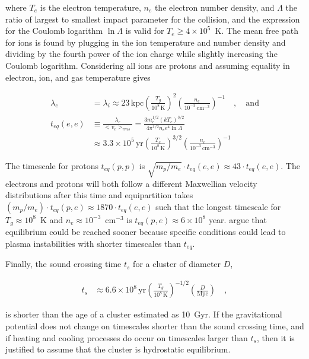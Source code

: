 \documentclass[MScProj_TLRH_ClusterEnergy.tex]{subfiles}
\begin{document}
\noindent where $T_e$ is the electron temperature, $n_e$ the electron number
density, and $\Lambda$ the ratio of largest to smallest impact parameter for
the collision, and the expression for the Coulomb logarithm $\ln \Lambda$ is 
valid for $T_e \geq 4 \times 10^5$~K. The mean free path for ions is found by 
plugging in the ion temperature and number density and dividing by the fourth 
power of the ion charge while slightly increasing the Coulomb logarithm. 
Considering all ions are protons and assuming equality in electron, ion, and gas
temperature gives

\begin{align}
    \lambda_e &= \lambda_i \approx 23 \, \text{kpc}
    \left( \frac{T_g}{10^8 \, \text{K}} \right)^2
    \left( \frac{n_e}{10^{-3} \, \text{cm}^{-3}} \right)^{-1}
    \quad , \quad \text{and}\label{eq:coulombmeanfreepathnumerical} \\
    t_{eq}(e,e) &\equiv \frac{\lambda_e}{<v_e>_{rms}} = 
    \frac{3 m_e^{1/2}(kT_e)^{3/2}}{4 \pi^{1/2} n_e e^4 \ln \Lambda} \\
    &\approx 3.3 \times 10^5 \, \text{yr} 
    \left( \frac{T_e}{10^8 \, \text{K}} \right)^{3/2}
    \left( \frac{n_e}{10^{-3} \, \text{cm}^{-3}} \right)^{-1} \label{eq:tcoulomb}
\end{align}

The timescale for protons $t_{eq}(p,p)$ is $\sqrt{m_p/m_e}\cdot t_{eq}(e,e) 
\approx 43 \cdot t_{eq}(e,e)$. The electrons and protons will both follow a
different Maxwellian velocity distributions after this time and equipartition
takes $(m_p/m_e) \cdot t_{eq}(p,e) \approx 1870 \cdot t_{eq}(e,e)$ such that
the longest timescale for $T_g\approx 10^8$~K and $n_e\approx10^{-3}$~cm$^{-3}$
is $t_{eq}(p,e)\approx6 \times 10^8$ year. \citet{1977ApJ...215..213M} argue
that equilibrium could be reached sooner because specific conditions could
lead to plasma instabilities with shorter timescales than $t_{eq}$.

Finally, the sound crossing time $t_s$ for a cluster of diameter $D$,

\begin{align}
    t_s &\approx 6.6 \times 10^8 \, \text{yr}
    \left( \frac{T_g}{10^8 \, \text{K}} \right)^{-1/2}
    \left( \frac{D}{\text{Mpc}} \right) \label{eq:soundcrossing} \quad ,
\end{align}

\noindent is shorter than the age of a cluster estimated as 10~Gyr. If the
gravitational potential does not change on timescales shorter than the
sound crossing time, and if heating and cooling processes do occur on timescales
larger than $t_s$, then it is justified to assume that the cluster is hydrostatic
equilibrium.
\end{document}
